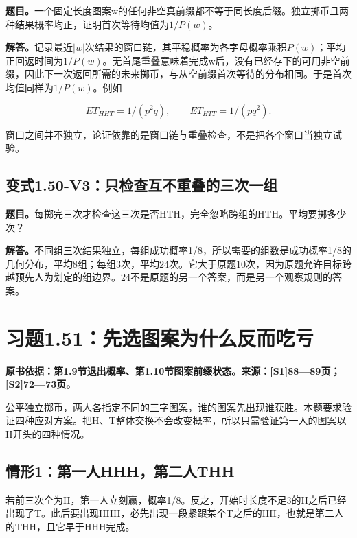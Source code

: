 \documentclass[
  11pt,
  a4paper,
  UTF8,
  fontset=fandol]{ctexart}
\begin{document}
\textbf{题目。}一个固定长度图案w的任何非空真前缀都不等于同长度后缀。独立掷币且两种结果概率均正，证明首次等待均值为\(1/P(w)\)。

\textbf{解答。}记录最近\(|w|\)次结果的窗口链，其平稳概率为各字母概率乘积\(P(w)\)；平均正回返时间为\(1/P(w)\)。无首尾重叠意味着完成w后，没有已经存下的可用非空前缀，因此下一次返回所需的未来掷币，与从空前缀首次等待的分布相同。于是首次均值同样为\(1/P(w)\)。例如

\[
\boxed{E T_{HHT}=1/(p^2q),\qquad E T_{HTT}=1/(pq^2).}
\]

窗口之间并不独立，论证依靠的是窗口链与重叠检查，不是把各个窗口当独立试验。

\subsection{变式1.50-V3：只检查互不重叠的三次一组}\label{ux53d8ux5f0f1.50-v3ux53eaux68c0ux67e5ux4e92ux4e0dux91cdux53e0ux7684ux4e09ux6b21ux4e00ux7ec4}

\textbf{题目。}每掷完三次才检查这三次是否HTH，完全忽略跨组的HTH。平均要掷多少次？

\textbf{解答。}不同组三次结果独立，每组成功概率1/8，所以需要的组数是成功概率1/8的几何分布，平均8组；每组3次，平均\(\boxed{24}\)次。它大于原题10次，因为原题允许目标跨越预先人为划定的组边界。24不是原题的另一个答案，而是另一个观察规则的答案。

\section{习题1.51：先选图案为什么反而吃亏}\label{ux4e60ux98981.51ux5148ux9009ux56feux6848ux4e3aux4ec0ux4e48ux53cdux800cux5403ux4e8f}

\textbf{原书依据：第1.9节退出概率、第1.10节图案前缀状态。来源：{[}S1{]}88---89页；{[}S2{]}72---73页。}

公平独立掷币，两人各指定不同的三字图案，谁的图案先出现谁获胜。本题要求验证四种应对方案。把H、T整体交换不会改变概率，所以只需验证第一人的图案以H开头的四种情况。

\subsection{情形1：第一人HHH，第二人THH}\label{ux60c5ux5f621ux7b2cux4e00ux4ebahhhux7b2cux4e8cux4ebathh}

若前三次全为H，第一人立刻赢，概率1/8。反之，开始时长度不足3的H之后已经出现了T。此后要出现HHH，必先出现一段紧跟某个T之后的HH，也就是第二人的THH，且它早于HHH完成。
\end{document}
